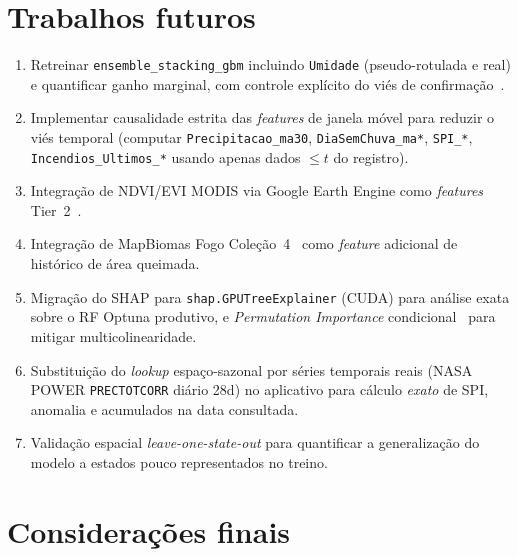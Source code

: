 \section{Trabalhos futuros}
\label{sec:conclusao_futuros}

\begin{enumerate}
  \item Retreinar \texttt{ensemble\_stacking\_gbm} incluindo \texttt{Umidade} (pseudo-rotulada e real) e quantificar ganho marginal, com controle explícito do viés de confirmação~\cite{arazo2020pseudo}.

  \item Implementar causalidade estrita das \emph{features} de janela móvel para reduzir o viés temporal (computar \texttt{Precipitacao\_ma30}, \texttt{DiaSemChuva\_ma*}, \texttt{SPI\_*}, \texttt{Incendios\_Ultimos\_*} usando apenas dados \(\leq t\) do registro).

  \item Integração de NDVI/EVI MODIS via Google Earth Engine como \emph{features} Tier~2~\cite{cheerala2025probabilistic}.

  \item Integração de MapBiomas Fogo Coleção~4~\cite{mapbiomasfogo} como \emph{feature} adicional de histórico de área queimada.

  \item Migração do SHAP para \texttt{shap.GPUTreeExplainer} (CUDA) para análise exata sobre o RF Optuna produtivo, e \emph{Permutation Importance} condicional~\cite{hooker2021unrestricted} para mitigar multicolinearidade.

  \item Substituição do \emph{lookup} espaço-sazonal por séries temporais reais (NASA POWER \texttt{PRECTOTCORR} diário 28d) no aplicativo para cálculo \emph{exato} de SPI, anomalia e acumulados na data consultada.

  \item Validação espacial \emph{leave-one-state-out} para quantificar a generalização do modelo a estados pouco representados no treino.
\end{enumerate}

\section{Considerações finais}
\label{sec:conclusao_consideracoes}

